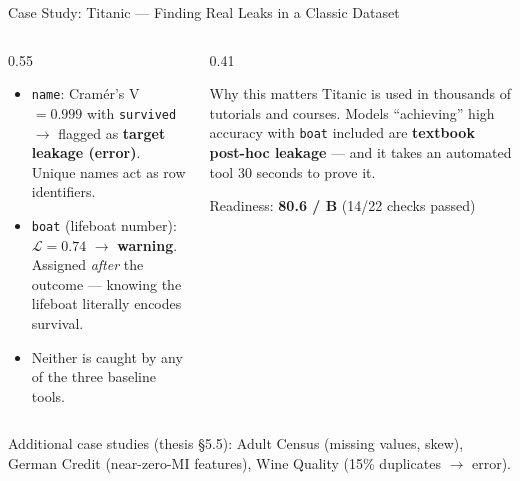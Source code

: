 \documentclass[11pt,aspectratio=169]{beamer}
\begin{document}
\begin{frame}{Case Study: Titanic --- Finding Real Leaks in a Classic Dataset}
  \begin{columns}[T]
    \begin{column}{0.55\textwidth}
      \begin{itemize}\setlength\itemsep{0.7em}
        \item \texttt{name}: Cramér's V $= 0.999$ with \texttt{survived} $\rightarrow$ flagged as \textbf{target leakage (error)}. Unique names act as row identifiers.
        \item \texttt{boat} (lifeboat number): $\mathcal{L} = 0.74$ $\rightarrow$ \textbf{warning}. Assigned \emph{after} the outcome --- knowing the lifeboat literally encodes survival.
        \item Neither is caught by any of the three baseline tools.
      \end{itemize}
    \end{column}
    \begin{column}{0.41\textwidth}
      \begin{block}{Why this matters}
        Titanic is used in thousands of tutorials and courses. Models
        ``achieving'' high accuracy with \texttt{boat} included are
        \textbf{textbook post-hoc leakage} --- and it takes an automated
        tool 30 seconds to prove it.
      \end{block}
      \vspace{0.4em}
      \footnotesize Readiness: \textbf{80.6 / B} (14/22 checks passed)
    \end{column}
  \end{columns}
  \vspace{0.6em}
  \footnotesize Additional case studies (thesis §5.5): Adult Census (missing values, skew), German Credit (near-zero-MI features), Wine Quality (15\% duplicates $\rightarrow$ error).
\end{frame}
\end{document}
